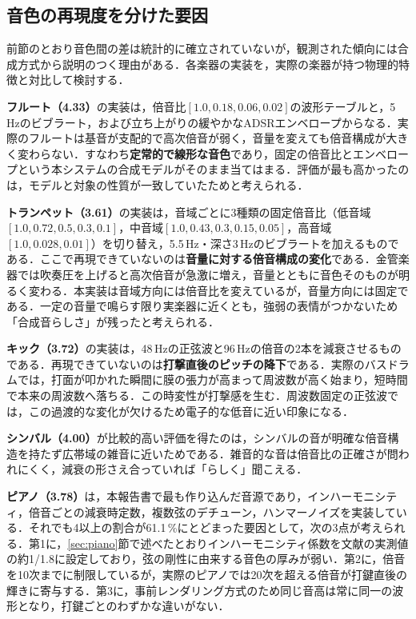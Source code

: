 \documentclass[uplatex,dvipdfmx]{jlreq}
\begin{document}
\subsection{音色の再現度を分けた要因}
\label{sec:disc-tone-cause}

前節のとおり音色間の差は統計的に確立されていないが，観測された傾向には合成方式から説明のつく理由がある．各楽器の実装を，実際の楽器が持つ物理的特徴と対比して検討する．

\textbf{フルート（4.33）}の実装は，倍音比$[1.0, 0.18, 0.06, 0.02]$の波形テーブルと，5\,Hzのビブラート，および立ち上がりの緩やかなADSRエンベロープからなる．実際のフルートは基音が支配的で高次倍音が弱く，音量を変えても倍音構成が大きく変わらない．すなわち\textbf{定常的で線形な音色}であり，固定の倍音比とエンベロープという本システムの合成モデルがそのまま当てはまる．評価が最も高かったのは，モデルと対象の性質が一致していたためと考えられる．

\textbf{トランペット（3.61）}の実装は，音域ごとに3種類の固定倍音比（低音域$[1.0, 0.72, 0.5, 0.3, 0.1]$，中音域$[1.0, 0.43, 0.3, 0.15, 0.05]$，高音域$[1.0, 0.028, 0.01]$）を切り替え，5.5\,Hz・深さ3\,Hzのビブラートを加えるものである．ここで再現できていないのは\textbf{音量に対する倍音構成の変化}である．金管楽器では吹奏圧を上げると高次倍音が急激に増え，音量とともに音色そのものが明るく変わる．本実装は音域方向には倍音比を変えているが，音量方向には固定である．一定の音量で鳴らす限り実楽器に近くとも，強弱の表情がつかないため「合成音らしさ」が残ったと考えられる．

\textbf{キック（3.72）}の実装は，48\,Hzの正弦波と96\,Hzの倍音の2本を減衰させるものである．再現できていないのは\textbf{打撃直後のピッチの降下}である．実際のバスドラムでは，打面が叩かれた瞬間に膜の張力が高まって周波数が高く始まり，短時間で本来の周波数へ落ちる．この時変性が打撃感を生む．周波数固定の正弦波では，この過渡的な変化が欠けるため電子的な低音に近い印象になる．

\textbf{シンバル（4.00）}が比較的高い評価を得たのは，シンバルの音が明確な倍音構造を持たず広帯域の雑音に近いためである．雑音的な音は倍音比の正確さが問われにくく，減衰の形さえ合っていれば「らしく」聞こえる．

\textbf{ピアノ（3.78）}は，本報告書で最も作り込んだ音源であり，インハーモニシティ，倍音ごとの減衰時定数，複数弦のデチューン，ハンマーノイズを実装している．それでも4以上の割合が61.1\,\%にとどまった要因として，次の3点が考えられる．第1に，\ref{sec:piano}節で述べたとおりインハーモニシティ係数を文献の実測値の約1/1.8に設定しており，弦の剛性に由来する音色の厚みが弱い．第2に，倍音を10次までに制限しているが，実際のピアノでは20次を超える倍音が打鍵直後の輝きに寄与する．第3に，事前レンダリング方式のため同じ音高は常に同一の波形となり，打鍵ごとのわずかな違いがない．
\end{document}
